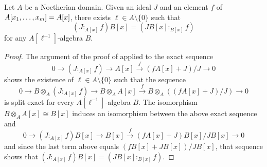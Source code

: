 \documentclass{amsart}
\begin{document}
\begin{proposition}
   \label{colon mod p: P}
   Let $A$ be a Noetherian domain.
   Given an ideal $J$ and an element $f$ of $A[x_1, \ldots, x_m] = A[x]$, there exists $\ell \in A \setminus \{0\}$ such that
   \[
      (J:_{A[x]} f)B[x] = (JB[x] :_{B[x]} f)
   \]
   for any $A[\ell^{-1}]$-algebra $B$.
\end{proposition}

\begin{proof}
   The argument of the proof of  applied to the exact sequence
    \[
       0 \to (J :_{A[x]} f) \to A[x] \stackrel{f}{\longrightarrow} (f A[x] + J)/J \to 0
    \]
    shows the existence of $\ell \in A \setminus \{0\}$ such that the sequence
    \[
       0 \to B \otimes_A (J :_{A[x]} f) \to B \otimes_A A[x] \stackrel{f}{\longrightarrow} B \otimes_A ((f A[x] + J)/J) \to 0
    \]
    is split exact for every $A[\ell^{-1}]$-algebra $B$.
    The isomorphism $B \otimes_A A[x] \cong B[x]$ induces an isomorphism between the above exact sequence and
    \[
       0 \to (J :_{A[x]} f) B[x] \to  B[x] \stackrel{f}{\longrightarrow} (f A[x] + J)B[x]/JB[x] \to 0
    \]
    and since the last term above equals $(fB[x] + JB[x])/JB[x]$, that sequence shows that $(J:_{A[x]} f)B[x] = (JB[x] :_{B[x]} f)$.
\end{proof}

\end{document}
